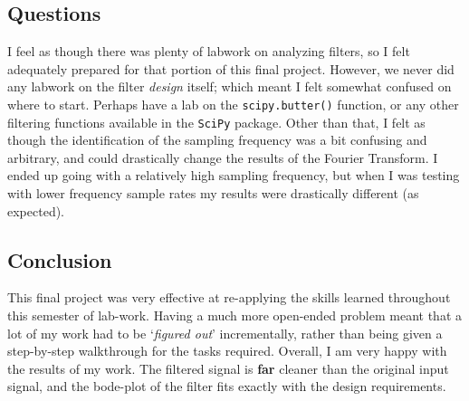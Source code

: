 \documentclass[11pt]{article}
\begin{document}
\hypertarget{questions}{%
\subsection{Questions}\label{questions}}

I feel as though there was plenty of labwork on analyzing filters, so I
felt adequately prepared for that portion of this final project.
However, we never did any labwork on the filter \emph{design} itself;
which meant I felt somewhat confused on where to start. Perhaps have a
lab on the \texttt{scipy.butter()} function, or any other filtering
functions available in the \texttt{SciPy} package. Other than that, I
felt as though the identification of the sampling frequency was a bit
confusing and arbitrary, and could drastically change the results of the
Fourier Transform. I ended up going with a relatively high sampling
frequency, but when I was testing with lower frequency sample rates my
results were drastically different (as expected).

\hypertarget{conclusion}{%
\subsection{Conclusion}\label{conclusion}}

This final project was very effective at re-applying the skills learned
throughout this semester of lab-work. Having a much more open-ended
problem meant that a lot of my work had to be `\emph{figured out}'
incrementally, rather than being given a step-by-step walkthrough for
the tasks required. Overall, I am very happy with the results of my
work. The filtered signal is \textbf{far} cleaner than the original
input signal, and the bode-plot of the filter fits exactly with the
design requirements.


    
    
    
    
\end{document}
